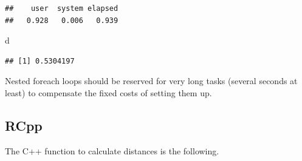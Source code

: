 \documentclass[
  12pt,
  american,
  a4paper,
  extrafontsizes,onecolumn,openright
  ]{memoir}
\newenvironment{Shaded}{\begin{snugshade}}{\end{snugshade}}
\newcommand{\NormalTok}[1]{#1}
\begin{document}
\begin{verbatim}
##    user  system elapsed 
##   0.928   0.006   0.939
\end{verbatim}

\begin{Shaded}
\begin{Highlighting}[]
\NormalTok{d}
\end{Highlighting}
\end{Shaded}

\begin{verbatim}
## [1] 0.5304197
\end{verbatim}

\normalsize

Nested foreach loops should be reserved for very long tasks (several seconds at least) to compensate the fixed costs of setting them up.

\subsection{RCpp}\label{rcpp}

The C++ function to calculate distances is the following.

\scriptsize
\end{document}

